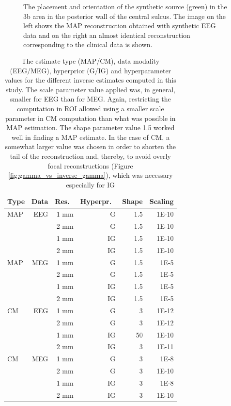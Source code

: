 \documentclass[5p]{elsarticle}
\begin{document}
\begin{figure}[h!]
\begin{footnotesize}
\begin{center}
\end{center}
\end{footnotesize}
\caption{The placement and orientation of the synthetic source (green) in the 3b area in the posterior wall of the central sulcus. The image on the left shows the MAP reconstruction obtained with synthetic EEG data and on the right an almost identical reconstruction corresponding to the clinical data is shown.}
\label{fig:source_placement} 
\end{figure}

\begin{table}[h!]
\caption{The estimate type (MAP/CM), data modality (EEG/MEG), hyperprior (G/IG) and hyperparameter values for the different inverse estimates computed in this study. The scale parameter  value applied was, in general, smaller for EEG than for MEG. Again, restricting the computation in ROI allowed using a smaller scale parameter in CM computation than what was possible in MAP estimation. The shape parameter value 1.5 worked well in finding a MAP estimate. In the case of CM, a somewhat larger value was chosen in order to shorten the tail of the reconstruction and, thereby, to avoid overly focal reconstructions (Figure \ref{fig:gamma_vs_inverse_gamma}), which was necessary especially for IG}
\label{tab:inverse_estimates}
\centering
\begin{tabular}{|l|r|r|r|r|r|}
\hline
Type & Data & Res.\ & Hyperpr.\ & Shape &Scaling  \\
\hline
MAP & EEG & 1 mm & G & 1.5 & 1E-10   \\
 &  & 2 mm & G & 1.5 & 1E-10   \\ 
 &  & 1 mm & IG & 1.5 & 1E-10   \\
 &  & 2 mm & IG & 1.5 & 1E-10   \\ 
 MAP & MEG & 1 mm & G & 1.5 & 1E-5   \\
 &  & 2 mm & G & 1.5 & 1E-5   \\ 
 &  & 1 mm & IG & 1.5 & 1E-5   \\
 &  & 2 mm & IG & 1.5 & 1E-5   \\ 
 CM & EEG & 1 mm & G & 3 & 1E-12   \\
 &  & 2 mm & G & 3 & 1E-12   \\ 
 &  & 1 mm & IG & 50 & 1E-10   \\
 &  & 2 mm & IG & 3 & 1E-11   \\ 
CM & MEG & 1 mm & G & 3 & 1E-8   \\
 &  & 2 mm & G & 3 &  1E-10   \\ 
 &  & 1 mm & IG & 3 & 1E-8   \\
 &  & 2 mm & IG & 3 & 1E-10   \\ 
\hline
\end{tabular}
\end{table} 
\end{document}
